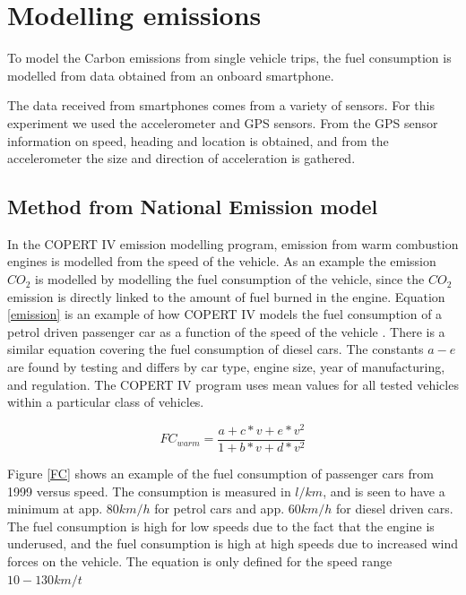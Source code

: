 \section{Modelling emissions}

To model the Carbon emissions from single vehicle trips, the fuel consumption is modelled from data obtained from an onboard smartphone.

The data received from smartphones comes from a variety of sensors. For this experiment we used the accelerometer and GPS sensors. From the GPS sensor information on speed, heading and location is obtained, and from the accelerometer the size and direction of acceleration is gathered.

\subsection{Method from National Emission model}

In the COPERT IV emission modelling program, emission from warm combustion engines is modelled from the speed of the vehicle. As an example the emission $CO_2$ is modelled by modelling the fuel consumption of the vehicle, since the $CO_2$ emission is directly linked to the amount of fuel burned in the engine. Equation \ref{emission} is an example of how COPERT IV models the fuel consumption of a petrol driven passenger car as a function of the speed of the vehicle \cite{Ntziachristos2012}. There is a similar equation covering the fuel consumption of diesel cars. The constants $a-e$ are found by testing and differs by car type, engine size, year of manufacturing, and regulation. The COPERT IV program uses mean values for all tested vehicles within a particular class of vehicles.

\begin{equation}
	FC_{warm} = \frac{a + c*v + e*v^2}{1 + b*v + d*v^2}
	\label{emission}
\end{equation}

Figure \ref{FC} shows an example of the fuel consumption of passenger cars from 1999 versus speed. The consumption is measured in $l/km$, and is seen to have a minimum at app. $80 km/h$ for petrol cars and app. $60 km/h$ for diesel driven cars. The fuel consumption is high for low speeds due to the fact that the engine is underused, and the fuel consumption is high at high speeds due to increased wind forces on the vehicle. The equation is only defined for the speed range $10 - 130 km/t$
 
